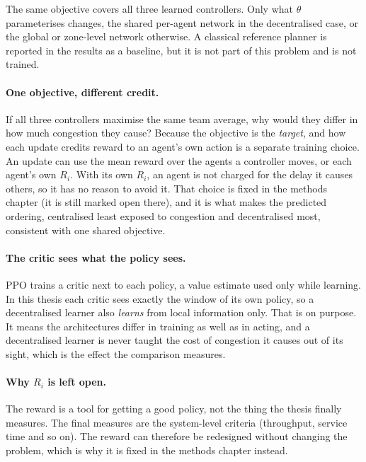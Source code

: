 \documentclass[11pt,a4paper]{article}
\begin{document}
\noindent The same objective covers all three learned controllers. Only
what $\theta$ parameterises changes, the shared per-agent network in the
decentralised case, or the global or zone-level network otherwise. A
classical reference planner is reported in the results as a baseline, but
it is not part of this problem and is not trained.

\paragraph{One objective, different credit.} If all three controllers
maximise the same team average, why would they differ in how much
congestion they cause? Because the objective is the \emph{target}, and
how each update credits reward to an agent's own action is a separate
training choice. An update can use the mean reward over the agents a
controller moves, or each agent's own $R_i$. With its own $R_i$, an agent
is not charged for the delay it causes others, so it has no reason to
avoid it. That choice is fixed in the methods chapter (it is still marked
open there), and it is what makes the predicted ordering, centralised
least exposed to congestion and decentralised most, consistent with one
shared objective.

\paragraph{The critic sees what the policy sees.} PPO trains a critic
next to each policy, a value estimate used only while learning. In this
thesis each critic sees exactly the window of its own policy, so a
decentralised learner also \emph{learns} from local information only.
That is on purpose. It means the architectures differ in training as well
as in acting, and a decentralised learner is never taught the cost of
congestion it causes out of its sight, which is the effect the comparison
measures.

\paragraph{Why $R_i$ is left open.} The reward is a tool for getting a
good policy, not the thing the thesis finally measures. The final
measures are the system-level criteria (throughput, service time and so
on). The reward can therefore be redesigned without changing the
problem, which is why it is fixed in the methods chapter instead.

\end{document}
